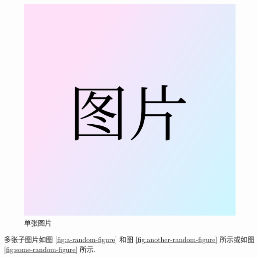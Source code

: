 \documentclass[UTF8,12pt,punct=kaiming,fontset=none]{ctexart}
\begin{document}
    \begin{figure}[H]
        \includegraphics[width=0.3\linewidth]{figures/figure.png}
        \caption{单张图片}
        \label{fig:a-figure}
    \end{figure}

    多张子图片如图 \ref{fig:a-random-figure} 和图 \ref{fig:another-random-figure} 所示或如图 \ref{fig:some-random-figure} 所示.
\end{document}
